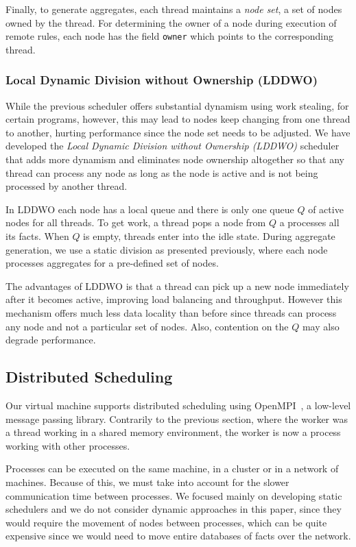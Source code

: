 \documentclass[preprint]{sigplanconf}
\begin{document}
Finally, to generate aggregates, each thread maintains a \emph{node set}, a set of nodes owned
by the thread. For determining the owner of a node during execution of remote rules, each node
has the field \texttt{owner} which points to the corresponding thread.

\subsubsection{Local Dynamic Division without Ownership (LDDWO)}

While the previous scheduler offers substantial dynamism using work stealing,
for certain programs, however, this may lead to nodes keep changing from one thread
to another, hurting performance since the node set needs to be adjusted.
We have developed the \emph{Local Dynamic Division
without Ownership (LDDWO)} scheduler that adds more dynamism and eliminates node ownership
altogether so that any thread can process any node as long as the node is active and is
not being processed by another thread.

In LDDWO each node has a local queue and there is only one queue $Q$ of active nodes for all threads.
To get work, a thread pops a node from $Q$ a processes all its facts. When $Q$ is empty,
threads enter into the idle state.
During aggregate generation, we use a static division as presented previously, where each node
processes aggregates for a pre-defined set of nodes.

The advantages of LDDWO is that a thread can pick up a new node immediately after it becomes active,
improving load balancing and throughput.
However this mechanism offers much less data locality than before since threads can process any node
and not a particular set of nodes. Also, contention on the $Q$ may also degrade performance.

\subsection{Distributed Scheduling}\label{sec:distributed}

Our virtual machine supports distributed scheduling using OpenMPI~\cite{gabriel04-open-mpi},
a low-level message passing library. Contrarily to the previous section, where the worker was
a thread working in a shared memory environment, the worker is now a process working with
other processes.

Processes can be executed on the same machine, in a cluster or in a network of machines.
Because of this, we must take into account for the slower communication time between
processes. We focused mainly on developing static schedulers
and we do not consider dynamic approaches in this paper, since they would require
the movement of nodes between processes, which can be quite expensive since we would
need to move entire databases of facts over the network.
\end{document}
